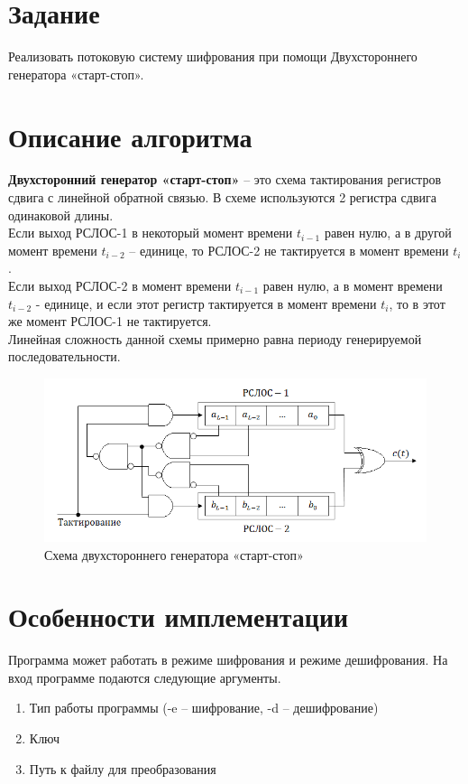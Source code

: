 \documentclass{article}
\begin{document}
\section{Задание}
Реализовать потоковую систему шифрования при помощи Двухстороннего генератора «старт-стоп».

\section{Описание алгоритма}
\textbf{Двухсторонний генератор «старт-стоп»} -- это схема тактирования регистров сдвига с линейной обратной связью. В схеме используются 2 регистра сдвига одинаковой длины. \\

Если выход РСЛОС-1 в некоторый момент времени $t_{i-1}$ равен нулю, а в другой момент времени $t_{i-2}$ -- единице, то РСЛОС-2 не тактируется в момент времени $t_{i}$. \\

Если выход РСЛОС-2 в момент времени $t_{i-1}$ равен нулю, а в момент времени $t_{i-2}$ - единице, и если этот регистр тактируется в момент времени $t_{i}$, то в этот же момент РСЛОС-1 не тактируется. \\

Линейная сложность данной схемы примерно равна периоду генерируемой последовательности.

\begin{figure}[H]
    \begin{flushleft} \centerline{\includegraphics[scale=0.6]{stopandgo.png}}
        \caption{Схема двухстороннего генератора «старт-стоп»}
    \end{flushleft}
\end{figure}


\section{Особенности имплементации}
Программа может работать в режиме шифрования и режиме дешифрования.
На вход программе подаются следующие аргументы. 
\begin{enumerate}
	\item Тип работы программы (-e -- шифрование, -d -- дешифрование)
	\item Ключ
	\item Путь к файлу для преобразования 
\end{enumerate} 
\end{document}
